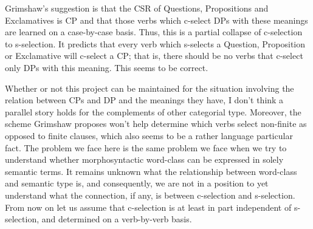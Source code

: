 Grimshaw's suggestion is that the CSR of Questions, Propositions and Exclamatives is CP and that those verbs which c-select DPs with these meanings are learned on a case-by-case basis. Thus, this is a partial collapse of c-selection to s-selection. It predicts that every verb which s-selects a Question, Proposition or Exclamative will c-select a CP; that is, there should be no verbs that c-select only DPs with this meaning. This seems to be correct.

Whether or not this project can be maintained for the situation involving the relation between CPs and DP and the  meanings they have, I don't think a parallel story holds for the complements of other categorial type. Moreover, the scheme Grimshaw proposes won't help determine which verbs select non-finite as opposed to finite clauses, which also seems to be a rather language particular fact. The problem we face here is the same problem we face when we try to understand whether morphosyntactic word-class can be expressed in solely semantic terms. It remains unknown what the relationship between word-class and semantic type is, and consequently, we are not in a position to yet understand what the connection, if any, is between c-selection and s-selection. From now on let us assume that c-selection is at least in part independent of s-selection, and determined on a verb-by-verb basis.

